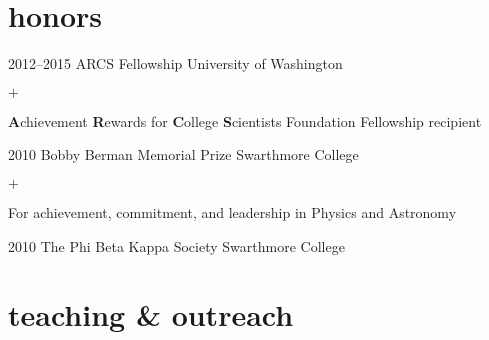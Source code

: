\documentclass[]{luger-cv} %
\begin{document}
\section{honors}

\begin{entrylist}


\entry
{2012--2015}
{ARCS Fellowship}
{University of Washington}
{%
\vspace{-1em}
\begin{list}{$+$}{\cvlist}
\item \textbf{A}chievement \textbf{R}ewards for \textbf{C}ollege \textbf{S}cientists
Foundation Fellowship recipient
\end{list}
}


\entry
{2010}
{Bobby Berman Memorial Prize}
{Swarthmore College}
{%
\vspace{-1em}
\begin{list}{$+$}{\cvlist}
\item For achievement, commitment, and
leadership in Physics and Astronomy
\end{list}
}


\entry
{2010}
{The Phi Beta Kappa Society}
{Swarthmore College}
{}


\end{entrylist}


\section{teaching \& outreach}
\end{document}
